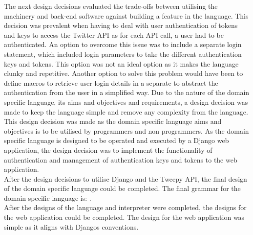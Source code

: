 The next design decisions evaluated the trade-offs between utilising the machinery and back-end software against building a feature in the language. This decision was prevalent when having to deal with user authentication of tokens and keys to access the Twitter API as for each API call, a user had to be authenticated. An option to overcome this issue was to include a separate login statement, which included login parameters to take the different authentication keys and tokens. This option was not an ideal option as it makes the language clunky and repetitive. Another option to solve this problem would have been to define macros to retrieve user login details in a separate to abstract the authentication from the user in a simplified way. Due to the nature of the domain specific language, its aims and objectives and requirements, a design decision was made to keep the language simple and remove any complexity from the language. This design decision was made as the domain specific language aims and objectives is to be utilised by programmers and non programmers. As the domain specific language is designed to be operated and executed by a Django web application, the design decision was to implement the functionality of authentication and management of authentication keys and tokens to the web application. \\

After the design decisions to utilise Django and the Tweepy API, the final design of the domain specific language could be completed. The final grammar for the domain specific language is: . \\

After the designs of the language and interpreter were completed, the designs for the web application could be completed. The design for the web application was simple as it aligns with Djangos conventions. 

